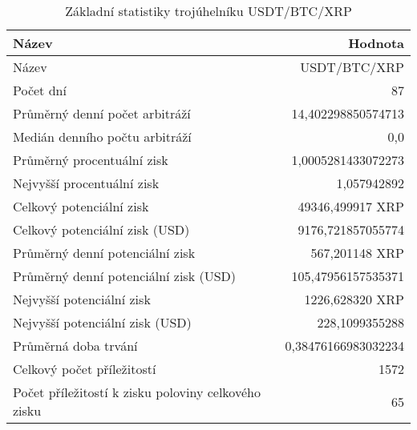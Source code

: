 \begin{table}\centering
\caption{Základní statistiky trojúhelníku USDT/BTC/XRP}
\label{USDTBTCXRP_stats}
\begin{tabular}{|| l | r ||}
\hline Název & Hodnota \\ 
\hline\hline Název & USDT/BTC/XRP \\ 
\hline Počet dní & 87 \\ 
\hline Průměrný denní počet arbitráží & 14,402298850574713 \\ 
\hline Medián denního počtu arbitráží & 0,0 \\ 
\hline Průměrný procentuální zisk & 1,0005281433072273 \\ 
\hline Nejvyšší procentuální zisk & 1,057942892 \\ 
\hline Celkový potenciální zisk & 49346,499917 XRP \\ 
\hline Celkový potenciální zisk (USD) & 9176,721857055774 \\ 
\hline Průměrný denní potenciální zisk & 567,201148 XRP \\ 
\hline Průměrný denní potenciální zisk (USD) & 105,47956157535371 \\ 
\hline Nejvyšší potenciální zisk & 1226,628320 XRP \\ 
\hline Nejvyšší potenciální zisk (USD) & 228,1099355288 \\ 
\hline Průměrná doba trvání & 0,38476166983032234 \\ 
\hline Celkový počet příležitostí & 1572 \\ 
\hline Počet příležitostí k zisku poloviny celkového zisku & 65 \\ 
\hline
\end{tabular}
\end{table}